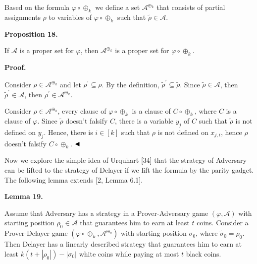 \documentclass[10pt,a4paper]{article}
\begin{document}
Based on the formula $\varphi\circ\oplus_{k}$ we define a set $\mathcal{A}^{\oplus_{k}}$ that
consists of partial assignments $\rho$ to variables of $\varphi\circ\oplus_{k}$ such that
$\tilde{\rho}\in\mathcal{A}$.\par



\par\medskip\noindent\textbf{
Proposition 18.
}\par



If $\mathcal{A}$ is a proper set for $\varphi$, then $\mathcal{A}^{\oplus_{k}}$ is a
proper set for $\varphi\circ\oplus_{k}$.\par



\par\medskip\noindent\textbf{Proof.}\par


Consider $\rho\in\mathcal{A}^{\oplus_{k}}$ and let $\rho^{\prime}\subseteq\rho$.
By the definition, $\tilde{\rho}^{\prime}\subseteq\tilde{\rho}$.
Since $\tilde{\rho}\in\mathcal{A}$,
then $\tilde{\rho}^{\prime}\in\mathcal{A}$, then $\rho^{\prime}\in\mathcal{A}^{\oplus_{k}}$.\par



Consider $\rho\in\mathcal{A}^{\oplus_{k}}$, every clause of $\varphi\circ\oplus_{k}$ is a
clause of $C\circ\oplus_{k}$, where $C$ is a clause of $\varphi$.
Since $\tilde{\rho}$ doesn’t falsify $C$,
there is a variable $y_{j}$ of $C$ such that $\tilde{\rho}$ is not defined on $y_{j}$.
Hence, there is $i\in[k]$ such that $\rho$ is not defined on $x_{j,i}$, hence $\rho$ doesn’t falsify $C\circ\oplus_{k}$.
$\hfill\blacktriangleleft$\par



Now we explore the simple idea of Urquhart [34] that the strategy of
Adversary can be lifted to the strategy of Delayer if we lift the formula by the parity gadget.
The following lemma extends [2, Lemma 6.1].\par



\par\medskip\noindent\textbf{
Lemma 19.
}\par



Assume that Adversary has a strategy in a Prover-Adversary game
$(\varphi,\mathcal{A})$ with starting position $\rho_{0}\in\mathcal{A}$
that guarantees him to earn at least $t$ coins.
Consider a Prover-Delayer game $(\varphi\circ\oplus_{k},\mathcal{A}^{\oplus_{k}})$
with starting position $\sigma_{0}$, where $\tilde{\sigma}_{0}=\rho_{0}$.
Then Delayer has a linearly described strategy that guarantees him to earn at
least $k(t+|\rho_{0}|)-|\sigma_{0}|$ white coins while paying at most $t$ black coins.\par
\end{document}

